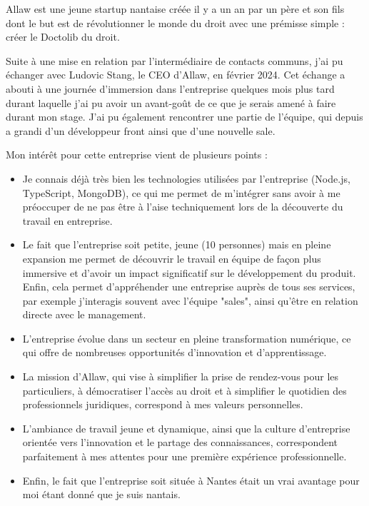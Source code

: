 Allaw est une jeune startup nantaise créée il y a un an par un père et son fils
dont le but est de révolutionner le monde du droit avec une prémisse simple :
créer le Doctolib du droit.

Suite à une mise en relation par l'intermédiaire de contacts communs, j'ai
pu échanger avec Ludovic Stang, le CEO d'Allaw, en février 2024. Cet échange
a abouti à une journée d'immersion dans l'entreprise quelques mois plus tard
durant laquelle j'ai pu avoir un avant-goût de ce que je serais amené à faire
durant mon stage. J'ai pu également rencontrer une partie de l'équipe, qui
depuis a grandi d'un développeur front ainsi que d'une nouvelle sale.

Mon intérêt pour cette entreprise vient de plusieurs points :
\begin{itemize}
  \item Je connais déjà très bien les technologies utilisées par l'entreprise
        (Node.js, TypeScript, MongoDB),
        ce qui me permet de m'intégrer sans avoir à me préoccuper de ne pas
        être à l'aise techniquement lors de la découverte du travail en entreprise.

  \item Le fait que l'entreprise soit petite, jeune (10 personnes) mais en pleine
        expansion me permet de découvrir le travail en équipe de façon plus immersive
        et d'avoir un impact significatif sur le développement du produit. Enfin, cela
        permet d'appréhender une entreprise auprès de tous ses services, par exemple
        j'interagis souvent avec l'équipe "sales", ainsi qu'être en relation directe
        avec le management.

  \item L'entreprise évolue dans un secteur en pleine transformation numérique,
        ce qui offre de nombreuses opportunités d'innovation et d'apprentissage.

  \item La mission d'Allaw, qui vise à simplifier la prise de rendez-vous pour les
        particuliers, à démocratiser l'accès au droit et à simplifier le quotidien des
        professionnels juridiques, correspond à mes valeurs personnelles.

  \item L'ambiance de travail jeune et dynamique, ainsi que la culture d'entreprise
        orientée vers l'innovation et le partage des connaissances, correspondent
        parfaitement à mes attentes pour une première expérience professionnelle.

  \item Enfin, le fait que l'entreprise soit située à Nantes était un vrai
        avantage pour moi étant donné que je suis nantais.
\end{itemize}


